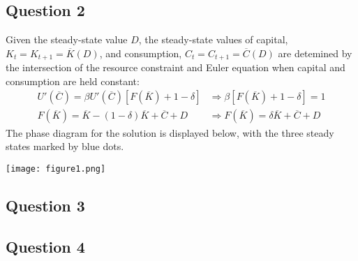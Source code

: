 \documentclass{article}
\begin{document}
\subsection*{Question 2}
Given the steady-state value $D$, the steady-state values of capital, ${K_t=K_{t+1}=\overline{K}(D)}$, and consumption, ${C_t=C_{t+1}=\overline{C}(D)}$ are detemined by the intersection of the resource constraint and Euler equation when capital and consumption are held constant:
\begin{align*}
	U'(\overline{C}) = \beta U'(\overline{C})\left[F(\overline{K})+1-\delta\right] 
		&\Rightarrow \beta\left[F(\overline{K})+1-\delta\right] = 1	\\
	F(\overline{K}) = \overline{K} - (1-\delta)\overline{K} + \overline{C} + D
		&\Rightarrow F(\overline{K}) = \delta\overline{K} + \overline{C} + D
\end{align*}
The phase diagram for the solution is displayed below, with the three steady states marked by blue dots.
\begin{center}
	\texttt{[image: figure1.png]}
\end{center}


\subsection*{Question 3}



\subsection*{Question 4}


\end{document}
